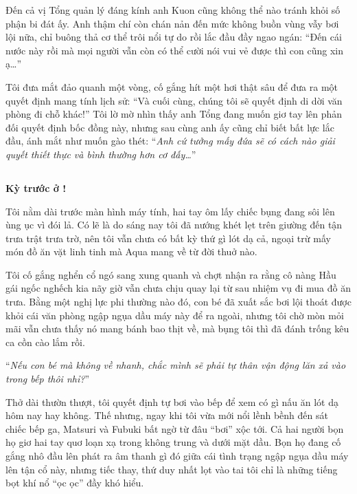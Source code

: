 \documentclass[../main.tex]{subfiles}
\begin{document}
Đến cả vị Tổng quản lý đáng kính anh Kuon cũng không thể nào tránh khỏi số phận bi đát ấy. Anh thậm chí còn chán nản đến mức không buồn vùng vẫy bơi lội nữa, chỉ buông thả cơ thể trôi nổi tự do rồi lắc đầu đầy ngao ngán: ``Đến cái nước này rồi mà mọi người vẫn còn có thể cười nói vui vẻ được thì con cũng xin ạ\dots''

Tôi đưa mắt đảo quanh một vòng, cố gắng hít một hơi thật sâu để đưa ra một quyết định mang tính lịch sử: ``Và cuối cùng, chúng tôi sẽ quyết định di dời văn phòng đi chỗ khác!'' Tôi lờ mờ nhìn thấy anh Tổng đang muốn giơ tay lên phản đối quyết định bốc đồng này, nhưng sau cùng anh ấy cũng chỉ biết bất lực lắc đầu, ánh mắt như muốn gào thét: ``\textit{Anh cứ tưởng mấy đứa sẽ có cách nào giải quyết thiết thực và bình thường hơn cơ đấy\dots}''

\subsection*{\label{ep-003.VI}}

\begin{center}
  \textbf{Kỳ trước ở \hll !}
\end{center}


Tôi nằm dài trước màn hình máy tính, hai tay ôm lấy chiếc bụng đang sôi lên ùng ục vì đói lả. Có lẽ là do sáng nay tôi đã nướng khét lẹt trên giường đến tận trưa trật trưa trờ, nên tôi vẫn chưa có bất kỳ thứ gì lót dạ cả, ngoại trừ mấy món đồ ăn vặt linh tinh mà Aqua mang về từ đời thuở nào.

Tôi cố gắng nghển cổ ngó sang xung quanh và chợt nhận ra rằng cô nàng Hầu gái ngốc nghếch kia nãy giờ vẫn chưa chịu quay lại từ sau nhiệm vụ đi mua đồ ăn trưa. Bằng một nghị lực phi thường nào đó, con bé đã xuất sắc bơi lội thoát được khỏi cái văn phòng ngập ngụa dầu máy này để ra ngoài, nhưng tôi chờ mòn mỏi mãi vẫn chưa thấy nó mang bánh bao thịt về, mà bụng tôi thì đã đánh trống kêu ca cồn cào lắm rồi.

``\textit{Nếu con bé mà không về nhanh, chắc mình sẽ phải tự thân vận động lăn xả vào trong bếp thôi nhỉ?}''

Thở dài thườn thượt, tôi quyết định tự bơi vào bếp để xem có gì nấu ăn lót dạ hôm nay hay không. Thế nhưng, ngay khi tôi vừa mới nổi lềnh bềnh đến sát chiếc bếp ga, Matsuri và Fubuki bất ngờ từ đâu ``bơi'' xộc tới. Cả hai người bọn họ giơ hai tay quơ loạn xạ trong không trung và dưới mặt dầu. Bọn họ đang cố gắng nhô đầu lên phát ra âm thanh gì đó giữa cái tình trạng ngập ngụa dầu máy lên tận cổ này, nhưng tiếc thay, thứ duy nhất lọt vào tai tôi chỉ là những tiếng bọt khí nổ ``ọc ọc'' đầy khó hiểu.
\end{document}
